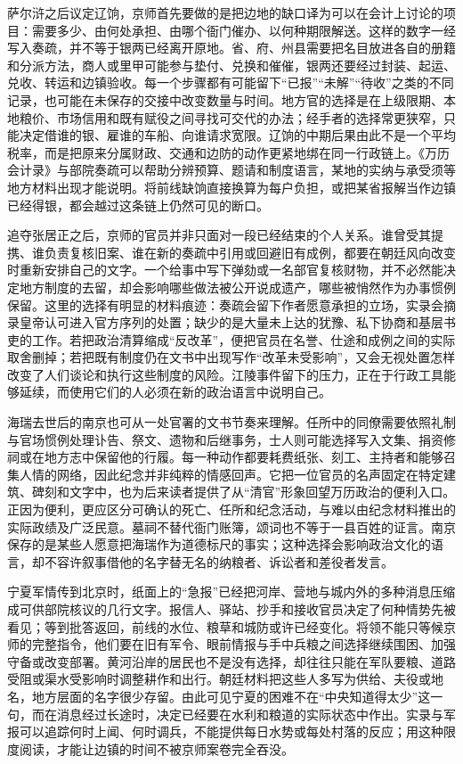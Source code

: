 萨尔浒之后议定辽饷，京师首先要做的是把边地的缺口译为可以在会计上讨论的项目：需要多少、由何处承担、由哪个衙门催办、以何种期限解送。这样的数字一经写入奏疏，并不等于银两已经离开原地。省、府、州县需要把名目放进各自的册籍和分派方法，商人或里甲可能参与垫付、兑换和催催，银两还要经过封装、起运、兑收、转运和边镇验收。每一个步骤都有可能留下“已报”“未解”“待收”之类的不同记录，也可能在未保存的交接中改变数量与时间。地方官的选择是在上级限期、本地粮价、市场信用和既有赋役之间寻找可交代的办法；经手者的选择常更狭窄，只能决定借谁的银、雇谁的车船、向谁请求宽限。辽饷的中期后果由此不是一个平均税率，而是把原来分属财政、交通和边防的动作更紧地绑在同一行政链上。《万历会计录》与部院奏疏可以帮助分辨预算、题请和制度语言，某地的实纳与承受须等地方材料出现才能说明。将前线缺饷直接换算为每户负担，或把某省报解当作边镇已经得银，都会越过这条链上仍然可见的断口。

追夺张居正之后，京师的官员并非只面对一段已经结束的个人关系。谁曾受其提携、谁负责复核旧案、谁在新的奏疏中引用或回避旧有成例，都要在朝廷风向改变时重新安排自己的文字。一个给事中写下弹劾或一名部官复核财物，并不必然能决定地方制度的去留，却会影响哪些做法被公开说成遗产，哪些被悄然作为办事惯例保留。这里的选择有明显的材料痕迹：奏疏会留下作者愿意承担的立场，实录会摘录皇帝认可进入官方序列的处置；缺少的是大量未上达的犹豫、私下协商和基层书吏的工作。若把政治清算缩成“反改革”，便把官员在名誉、仕途和成例之间的实际取舍删掉；若把既有制度仍在文书中出现写作“改革未受影响”，又会无视处置怎样改变了人们谈论和执行这些制度的风险。江陵事件留下的压力，正在于行政工具能够延续，而使用它们的人必须在新的政治语言中说明自己。

海瑞去世后的南京也可从一处官署的文书节奏来理解。任所中的同僚需要依照礼制与官场惯例处理讣告、祭文、遗物和后继事务，士人则可能选择写入文集、捐资修祠或在地方志中保留他的行履。每一种动作都要耗费纸张、刻工、主持者和能够召集人情的网络，因此纪念并非纯粹的情感回声。它把一位官员的名声固定在特定建筑、碑刻和文字中，也为后来读者提供了从“清官”形象回望万历政治的便利入口。正因为便利，更应区分可确认的死亡、任所和纪念活动，与难以由纪念材料推出的实际政绩及广泛民意。墓祠不替代衙门账簿，颂词也不等于一县百姓的证言。南京保存的是某些人愿意把海瑞作为道德标尺的事实；这种选择会影响政治文化的语言，却不容许叙事借他的名字替无名的纳粮者、诉讼者和差役者发言。

宁夏军情传到北京时，纸面上的“急报”已经把河岸、营地与城内外的多种消息压缩成可供部院核议的几行文字。报信人、驿站、抄手和接收官员决定了何种情势先被看见；等到批答返回，前线的水位、粮草和城防或许已经变化。将领不能只等候京师的完整指令，他们要在旧有军令、眼前情报与手中兵粮之间选择继续围困、加强守备或改变部署。黄河沿岸的居民也不是没有选择，却往往只能在军队要粮、道路受阻或渠水受影响时调整耕作和出行。朝廷材料把这些人多写为供给、夫役或地名，地方层面的名字很少存留。由此可见宁夏的困难不在“中央知道得太少”这一句，而在消息经过长途时，决定已经要在水利和粮道的实际状态中作出。实录与军报可以追踪何时上闻、何时调兵，不能提供每日水势或每处村落的反应；用这种限度阅读，才能让边镇的时间不被京师案卷完全吞没。

